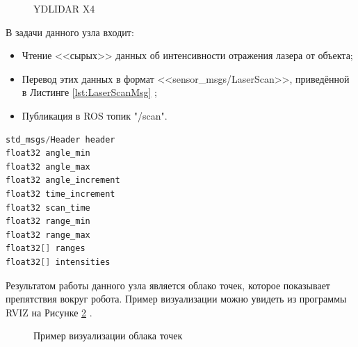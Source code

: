 \documentclass[12pt,a4paper]{scrartcl}
\begin{document}
				\begin{figure}[h]
					\caption{YDLIDAR X4}
					\label{fig:ydlidarx4}
				\end{figure}
				
				В задачи данного узла входит:
				\begin{itemize}
					\item Чтение <<сырых>> данных об интенсивности отражения лазера от объекта;
					\item Перевод этих данных в формат <<sensor\_msgs/LaserScan>>, приведённой в Листинге \ref{lst:LaserScanMsg} ;
					\item Публикация в ROS топик "/scan".
				\end{itemize}
				
				\begin{lstlisting}[language=C,caption={Формат сообщения sensor\_msgs/LaserScan},label={lst:LaserScanMsg}]
std_msgs/Header header
float32 angle_min
float32 angle_max
float32 angle_increment
float32 time_increment
float32 scan_time
float32 range_min
float32 range_max
float32[] ranges
float32[] intensities
				\end{lstlisting}	
				
				Результатом работы данного узла является облако точек, которое показывает препятствия вокруг робота\cite{bib:lidarDescription}. Пример визуализации можно увидеть из программы RVIZ на Рисунке \ref{fig:LaserScan} .
				
				\begin{figure}[h]
					\caption{Пример визуализации облака точек}
					\label{fig:LaserScan}
				\end{figure}
				
\end{document}
